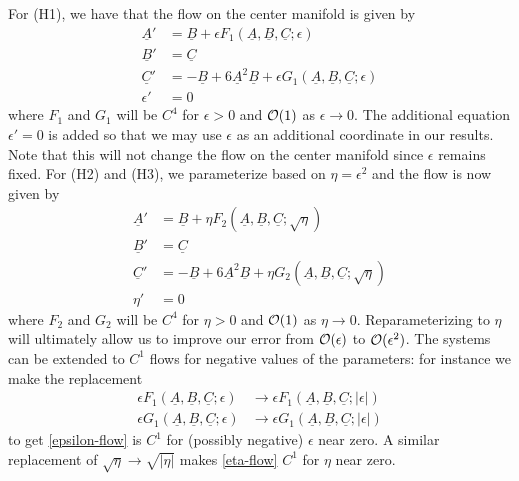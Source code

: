 For (H1), we have that the flow on the center manifold is given by
\begin{equation}\label{epsilon-flow}
	\begin{aligned}
		\underline A ' &= \underline B + \epsilon F_1(\underline A, \underline B, \underline C;\epsilon) \\
		\underline B ' &= \underline C \\
		\underline C ' &= - \underline B + 6 \underline A^2 \underline B + \epsilon G_1(\underline A, \underline B, \underline C;\epsilon) \\
		\epsilon' &= 0
	\end{aligned}
\end{equation}
where \(F_1\) and \(G_1\) will be \(C^4\) for \(\epsilon > 0\) and \(\mathcal{O}(1)\) as \(\epsilon \to 0\). The additional equation \(\epsilon' = 0\) is added so that we may use \(\epsilon\) as an additional coordinate in our results. Note that this will not change the flow on the center manifold since \(\epsilon\) remains fixed. For (H2) and (H3), we parameterize based on \(\eta = \epsilon^2\) and the flow is now given by
\begin{equation}\label{eta-flow}
	\begin{aligned}
		\underline A ' &= \underline B + \eta F_2(\underline A, \underline B, \underline C;\sqrt \eta) \\
		\underline B ' &= \underline C \\
		\underline C ' &= - \underline B + 6 \underline A^2 \underline B + \eta G_2(\underline A, \underline B, \underline C;\sqrt\eta) \\
		\eta' &= 0
	\end{aligned}
\end{equation}
where \(F_2\) and \(G_2\) will be \(C^4\) for \(\eta > 0\) and \(\mathcal{O}(1)\) as \(\eta \to 0\). Reparameterizing to \(\eta\) will ultimately allow us to improve our error from \(\mathcal{O}(\epsilon)\) to \(\mathcal{O}(\epsilon^2)\). The systems can be extended to \(C^1\) flows for negative values of the parameters: for instance we make the replacement
\begin{equation}
\begin{aligned}
	\epsilon F_1(\underline A, \underline B, \underline C; \epsilon) &\rightarrow \epsilon F_1(\underline A, \underline B, \underline C; |\epsilon|) \\
	\epsilon G_1(\underline A, \underline B, \underline C; \epsilon) &\rightarrow \epsilon G_1(\underline A, \underline B, \underline C; |\epsilon|)
\end{aligned}
\end{equation}
to get \cref{epsilon-flow} is \(C^1\) for (possibly negative) \(\epsilon\) near zero. A similar replacement of \(\sqrt \eta \rightarrow \sqrt{|\eta|}\) makes \cref{eta-flow} \(C^1\) for \(\eta\) near zero. 

